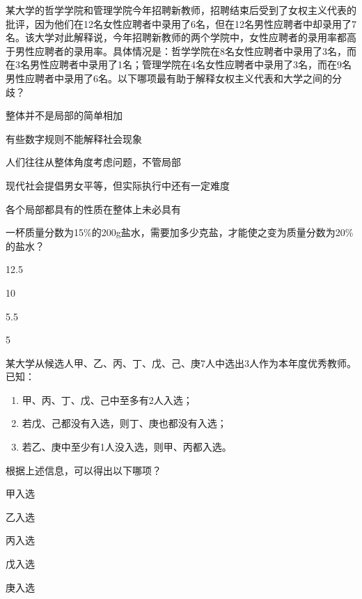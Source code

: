 \documentclass{exam-zh}
\begin{document}
\begin{question}
  某大学的哲学学院和管理学院今年招聘新教师，招聘结束后受到了女权主义代表的批评，因为他们在12名女性应聘者中录用了6名，但在12名男性应聘者中却录用了7名。该大学对此解释说，今年招聘新教师的两个学院中，女性应聘者的录用率都高于男性应聘者的录用率。具体情况是：哲学学院在8名女性应聘者中录用了3名，而在3名男性应聘者中录用了1名；管理学院在4名女性应聘者中录用了3名，而在9名男性应聘者中录用了6名。以下哪项最有助于解释女权主义代表和大学之间的分歧？ \paren

  \begin{choices}
    \item 整体并不是局部的简单相加
    \item 有些数字规则不能解释社会现象
    \item 人们往往从整体角度考虑问题，不管局部
    \item 现代社会提倡男女平等，但实际执行中还有一定难度
    \item 各个局部都具有的性质在整体上未必具有
  \end{choices}
\end{question}

\begin{question}
  一杯质量分数为15\%的200g盐水，需要加多少克盐，才能使之变为质量分数为20\%的盐水？ \paren

  \begin{choices}
    \item 12.5
    \item 10
    \item 5.5
    \item 5
  \end{choices}
\end{question}

\begin{question}
  某大学从候选人甲、乙、丙、丁、戊、己、庚7人中选出3人作为本年度优秀教师。已知：\begin{enumerate}
    \item 甲、丙、丁、戊、己中至多有2人入选；
    \item 若戊、己都没有入选，则丁、庚也都没有入选；
    \item 若乙、庚中至少有1人没入选，则甲、丙都入选。
  \end{enumerate}
  根据上述信息，可以得出以下哪项？ \paren

  \begin{choices}
    \item 甲入选
    \item 乙入选
    \item 丙入选
    \item 戊入选
    \item 庚入选
  \end{choices}
\end{question}
\end{document}
